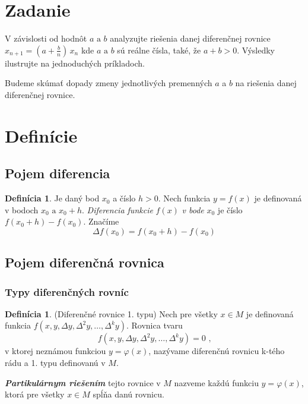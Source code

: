\documentclass[a4paper,10pt]{article}
\theoremstyle{plain}
\theoremstyle{definition}
\newtheorem{defin}[thm]{Definícia}
\begin{document}
\newpage

\tableofcontents



\newpage
\section{Zadanie}

V závislosti od hodnôt $ a \text{ a } b $
analyzujte riešenia danej diferenčnej rovnice\linebreak[4]
$x_{n+1}=\left(a+{\frac{b}{n}}\right)\,x_{n}$
kde $ a \text{ a } b $ sú reálne čísla, také, že $ a + b > 0$. Výsledky ilustrujte na jednoduchých príkladoch. 

Budeme skúmať dopady zmeny jednotlivých premenných $a$ a $b$ na riešenia danej diferenčnej rovnice.

\section{Definície}
\subsection{Pojem diferencia}

\begin{defin}
Je daný bod $x_{0}$ a číslo $h > 0$. Nech funkcia $y = f(x)$ je 
definovaná v bodoch $x_{0} \text{ a } x_{0} + h$. \textit{Diferencia funkcie }$f(x)$\textit{ v bode }$x_{0}$
je číslo $f(x_{0} + h) - f(x_{0})$. Značíme
$$\Delta f(x_{0}) = f(x_{0} + h) - f(x_{0})$$
\end{defin}
\subsection{Pojem diferenčná rovnica}
\subsubsection{Typy diferenčných rovníc}
\begin{defin}
(Diferenčné rovnice 1. typu) 
Nech pre všetky $x \in M$ je
definovaná funkcia $f(x, y, \Delta y, \Delta ^{2}y, \ldots, \Delta ^{k}y)$. Rovnica tvaru
$$f(x, y, \Delta y, \Delta ^{2}y, \ldots, \Delta ^{k}y) = 0 \text{ ,}$$
v ktorej neznámou funkciou $y = \varphi(x)$, nazývame diferenčnú rovnicu k-tého 
rádu a 1. typu definovanú v $M$.
\end{defin}

\textbf{\textit{Partikulárnym riešením}} tejto rovnice v $M$ nazveme každú funkciu
$y = \varphi(x)$, ktorá pre všetky $x \in M$ spĺňa danú rovnicu.
\end{document}
